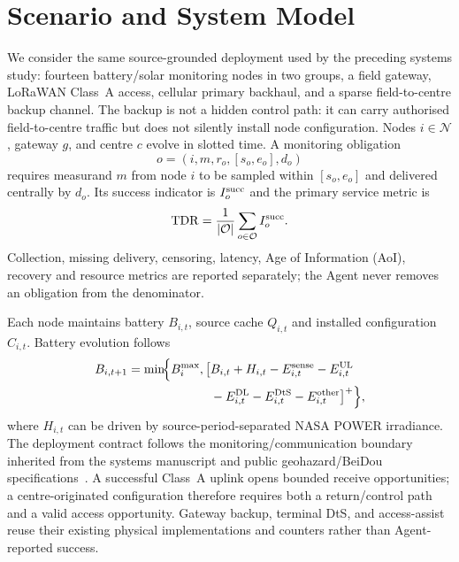 \documentclass[journal,10pt]{IEEEtran}
\begin{document}
\section{Scenario and System Model}
\label{sec:system}
We consider the same source-grounded deployment used by the preceding systems study: fourteen
battery/solar monitoring nodes in two groups, a field gateway, LoRaWAN Class~A access, cellular
primary backhaul, and a sparse field-to-centre backup channel. The backup is not a hidden control
path: it can carry authorised field-to-centre traffic but does not silently install node
configuration. Nodes $i\in\mathcal N$, gateway $g$, and centre $c$ evolve in slotted time. A
monitoring obligation
\begin{equation}
o=(i,m,r_o,[s_o,e_o],d_o)
\end{equation}
requires measurand $m$ from node $i$ to be sampled within $[s_o,e_o]$ and delivered centrally by
$d_o$. Its success indicator is $I_o^{\rm succ}$ and the primary service metric is
\begin{equation}
\mathrm{TDR}=\frac{1}{|\mathcal O|}\sum_{o\in\mathcal O} I_o^{\rm succ}.
\label{eq:tdr}
\end{equation}
Collection, missing delivery, censoring, latency, Age of Information (AoI), recovery and resource
metrics are reported separately; the Agent never removes an obligation from the denominator.

Each node maintains battery $B_{i,t}$, source cache $Q_{i,t}$ and installed configuration
$C_{i,t}$. Battery evolution follows
\begin{equation}
\begin{aligned}
B_{i,t+1}=\min\!\Bigl\{B_i^{\max},\bigl[&B_{i,t}+H_{i,t}
-E^{\rm sense}_{i,t}-E^{\rm UL}_{i,t}\\
&-E^{\rm DL}_{i,t}-E^{\rm DtS}_{i,t}-E^{\rm other}_{i,t}\bigr]^+\Bigr\},
\end{aligned}
\label{eq:battery}
\end{equation}
where $H_{i,t}$ can be driven by source-period-separated NASA POWER irradiance. The deployment
contract follows the monitoring/communication boundary inherited from the systems manuscript and
public geohazard/BeiDou specifications~\cite{dzt0450,dzt0460,bdsps3,ccsdssabr}. A successful
Class~A uplink opens bounded receive opportunities; a centre-originated configuration therefore
requires both a return/control path and a valid access opportunity. Gateway backup, terminal DtS,
and access-assist reuse their existing physical implementations and counters rather than Agent-
reported success.
\end{document}
